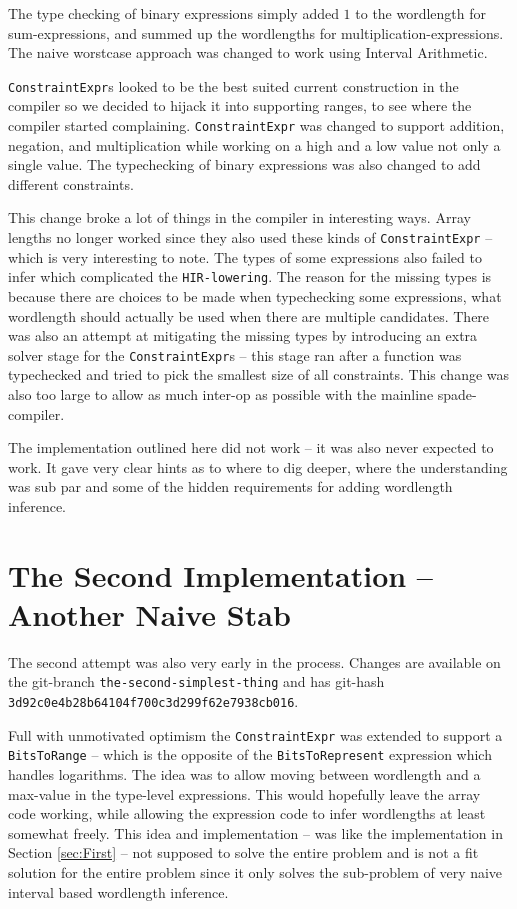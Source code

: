 The type checking of binary expressions simply added $1$ to the wordlength for sum-expressions, and summed up the wordlengths for multiplication-expressions. The naive worstcase approach was changed to work using Interval Arithmetic. 

\verb+ConstraintExpr+s looked to be the best suited current construction in the compiler so we decided to hijack it into supporting ranges, to see where the compiler started complaining. \verb+ConstraintExpr+ was changed to support addition, negation, and multiplication while working on a high and a low value not only a single value. The typechecking of binary expressions was also changed to add different constraints.

This change broke a lot of things in the compiler in interesting ways. Array lengths no longer worked since they also used these kinds of \verb+ConstraintExpr+ -- which is very interesting to note. The types of some expressions also failed to infer which complicated the \verb+HIR-lowering+. The reason for the missing types is because there are choices to be made when typechecking some expressions, what wordlength should actually be used when there are multiple candidates. There was also an attempt at mitigating the missing types by introducing an extra solver stage for the \verb+ConstraintExpr+s -- this stage ran after a function was typechecked and tried to pick the smallest size of all constraints. This change was also too large to allow as much inter-op as possible with the mainline spade-compiler.

The implementation outlined here did not work -- it was also never expected to work. It gave very clear hints as to where to dig deeper, where the understanding was sub par and some of the hidden requirements for adding wordlength inference.

\section{The Second Implementation -- Another Naive Stab}
\label{sec:Second}
The second attempt was also very early in the process. Changes are available on the git-branch \verb+the-second-simplest-thing+ and has git-hash \verb+3d92c0e4b28b64104f700c3d299f62e7938cb016+.

Full with unmotivated optimism the \verb+ConstraintExpr+ was extended to support a \verb+BitsToRange+ -- which is the opposite of the \verb+BitsToRepresent+ expression which handles logarithms. The idea was to allow moving between wordlength and a max-value in the type-level expressions. This would hopefully leave the array code working, while allowing the expression code to infer wordlengths at least somewhat freely. This idea and implementation -- was like the implementation in Section \ref{sec:First} -- not supposed to solve the entire problem and is not a fit solution for the entire problem since it only solves the sub-problem of very naive interval based wordlength inference.

